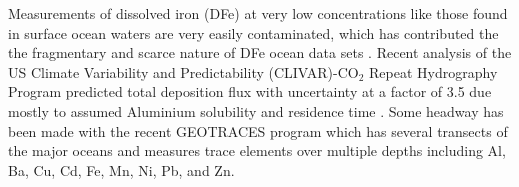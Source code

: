 Measurements of dissolved iron (DFe) at very low concentrations like those found in surface ocean waters are very easily contaminated, which has contributed the the fragmentary and scarce nature of DFe ocean data sets \cite{Rijkenberg_2014}.
Recent analysis of the US Climate Variability and Predictability (CLIVAR)-CO$_{2}$ Repeat Hydrography Program predicted total deposition flux with uncertainty at a factor of 3.5 due mostly to assumed Aluminium solubility and residence time \cite{Grand_2015}.
Some headway has been made with the recent GEOTRACES program which has several transects of the major oceans and measures trace elements over multiple depths including Al, Ba, Cu, Cd, Fe, Mn, Ni, Pb, and Zn.
  
  
  
  
  
  
  
  
  
  
  